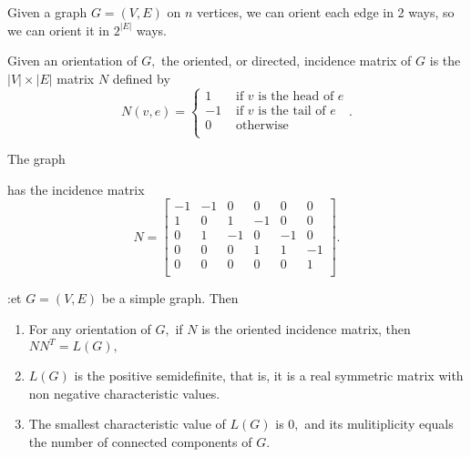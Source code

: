 Given a graph $G = (V,E)$ on $n$ vertices, we can orient each edge in 2
ways, so we can orient it in $2^{ \lvert E \rvert}$ ways.
\begin{definition}
Given an orientation of $G,$ the oriented, or directed, incidence matrix
of $G$ is the $\lvert V \rvert \times \lvert E \rvert$ matrix $N$
defined by
$$N(v,e) = \begin{cases}
	1 & \text{ if } v \text{ is the head of } e \\
	-1 & \text{ if } v \text{ is the tail of } e \\
	0 & \text{ otherwise }  \\
\end{cases}.$$
\end{definition}
The graph
\begin{figure}[h]
\centering
\end{figure}
has the incidence matrix
$$ N = \begin{bmatrix}
    -1    &     -1    &     0    &     0    &     0    &     0    \\
     1    &     0    &     1    &     -1    &     0    &     0    \\
     0    &     1    &     -1    &     0    &     -1    &     0    \\
     0    &     0    &     0    &     1    &     1    &     -1    \\
     0    &     0    &     0    &     0    &     0    &     1    \\
\end{bmatrix}.$$
\begin{theorem}[]
	:et $G=  (V,E)$ be a simple graph. Then 
	\begin{enumerate}
		\item For any orientation of $G,$ if $N$ is the oriented
			incidence matrix, then
			$NN^T = L(G),$
		\item $L(G)$ is the positive semidefinite, that is, it
			is a real symmetric matrix with non negative
			characteristic values.
		\item The smallest characteristic value of $L(G)$ is
			$0,$ and its mulitiplicity equals the number
			of connected components of $G.$
	\end{enumerate}
\end{theorem}
